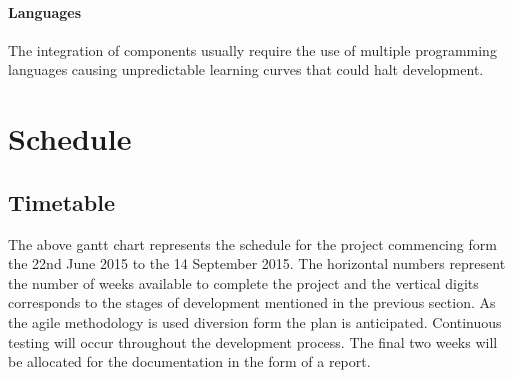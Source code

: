 \documentclass[a4paper, 11pt]{article}
\begin{document}
\paragraph{Languages}The integration of components usually require the use of multiple programming languages causing unpredictable learning curves that could halt development. 

\clearpage



\section{Schedule}

  \begin{gantt}{10}{12}
    \begin{ganttitle}
    \end{ganttitle}
  \end{gantt}
  

\subsection{Timetable}

The above gantt chart represents the schedule for the project commencing form the 22nd June 2015 to the 14 September 2015. The horizontal numbers represent the number of weeks available to complete the project and the vertical digits corresponds to the stages of development mentioned in the previous section. As the agile methodology is used diversion form the plan is anticipated. Continuous testing will occur throughout the development process. The final two weeks will be allocated for the documentation in the form of a report. 

\vspace{\baselineskip}
\end{document}
